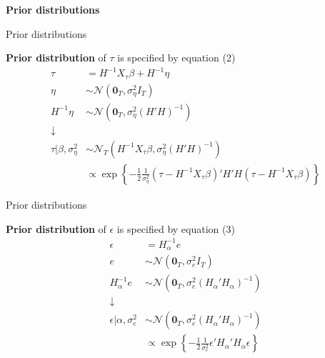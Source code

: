 \documentclass[notes,blackandwhite,mathsans,usenames,dvipsnames]{beamer}
\begin{document}
{
\begin{frame}

\begin{adjustwidth}{-0.5cm}{0cm}
\vspace{8.3cm}\Large
\textbf{{\color{mcxs2}Prior} {\color{mcxs1}distributions}}
\end{adjustwidth}

\end{frame}
}




\begin{frame}{Prior distributions}

\textbf{Prior distribution} of $\tau$ is specified by equation (2)
\begin{align*}
\tau&= H^{-1} X_\tau \beta + H^{-1}\eta\\ 
\eta &\sim \mathcal{N}\left(\mathbf{0}_T, \sigma^2_\eta I_T\right)\\
H^{-1}\eta &\sim \mathcal{N}\left(\mathbf{0}_T, \sigma^2_\eta (H'H)^{-1}\right)\\
\downarrow&\\
\tau|\beta,\sigma^2_\eta &\sim\mathcal{N}_T\left(H^{-1} X_\tau \beta, \sigma^2_\eta (H'H)^{-1}\right)\\
&\propto \exp\left\{-\frac{1}{2}\frac{1}{\sigma^2_\eta} \left(\tau-H^{-1} X_\tau \beta\right)'H'H\left(\tau-H^{-1} X_\tau \beta\right) \right\}
\end{align*}

\end{frame}


\begin{frame}{Prior distributions}

\textbf{Prior distribution} of $\epsilon$ is specified by equation (3)
\begin{align*}
\epsilon &=  H_\alpha^{-1}e\\
e &\sim \mathcal{N}\left(\mathbf{0}_T, \sigma^2_e I_T\right)\\
H_\alpha^{-1}e &\sim \mathcal{N}\left(\mathbf{0}_T, \sigma^2_e (H_{\alpha}'H_{\alpha})^{-1}\right)\\
\downarrow&\\
\epsilon|\alpha,\sigma^2_e &\sim\mathcal{N}\left(\mathbf{0}_T, \sigma^2_e (H_{\alpha}'H_{\alpha})^{-1}\right)\\
&\propto \exp\left\{-\frac{1}{2}\frac{1}{\sigma^2_e} \epsilon'H_{\alpha}'H_{\alpha}\epsilon \right\}
\end{align*}

\end{frame}
\end{document}
